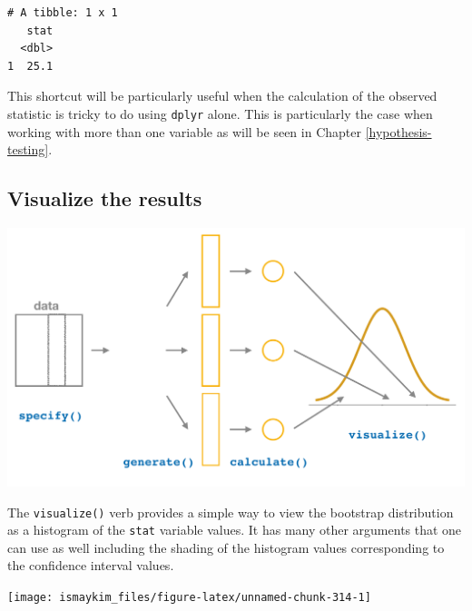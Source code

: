 \documentclass[12pt,]{krantz}
\makeatletter
\newenvironment{Shaded}{\begin{snugshade}}{\end{snugshade}}
\newcommand{\KeywordTok}[1]{\textcolor[rgb]{0.27,0.27,0.27}{\textbf{#1}}}
\newcommand{\StringTok}[1]{\textcolor[rgb]{0.5,0.5,0.5}{#1}}
\newcommand{\OperatorTok}[1]{\textcolor[rgb]{0.43,0.43,0.43}{\textbf{#1}}}
\newcommand{\NormalTok}[1]{#1}
\newenvironment{kframe}{%
\medskip{}
\setlength{\fboxsep}{.8em}
 \def\at@end@of@kframe{}%
 \ifinner\ifhmode%
  \def\at@end@of@kframe{\end{minipage}}%
  \begin{minipage}{\columnwidth}%
 \fi\fi%
 \def\FrameCommand##1{\hskip\@totalleftmargin \hskip-\fboxsep
 \colorbox{shadecolor}{##1}\hskip-\fboxsep
     \hskip-\linewidth \hskip-\@totalleftmargin \hskip\columnwidth}%
 \MakeFramed {\advance\hsize-\width
   \@totalleftmargin\z@ \linewidth\hsize
   \@setminipage}}%
 {\par\unskip\endMakeFramed%
 \at@end@of@kframe}
\renewenvironment{Shaded}{\begin{kframe}}{\end{kframe}}
\makeatother
\begin{document}
\begin{verbatim}
# A tibble: 1 x 1
   stat
  <dbl>
1  25.1
\end{verbatim}

This shortcut will be particularly useful when the calculation of the
observed statistic is tricky to do using \texttt{dplyr} alone. This is
particularly the case when working with more than one variable as will
be seen in Chapter \ref{hypothesis-testing}.

\subsection{Visualize the results}\label{visualize-the-results}

\begin{center}\includegraphics[width=\textwidth]{images/flowcharts/infer/visualize} \end{center}

The \texttt{visualize()} verb provides a simple way to view the
bootstrap distribution as a histogram of the \texttt{stat} variable
values. It has many other arguments that one can use as well including
the shading of the histogram values corresponding to the confidence
interval values.

\begin{Shaded}
\end{Shaded}

\begin{center}\texttt{[image: ismaykim\_files/figure-latex/unnamed-chunk-314-1]} \end{center}
\end{document}
